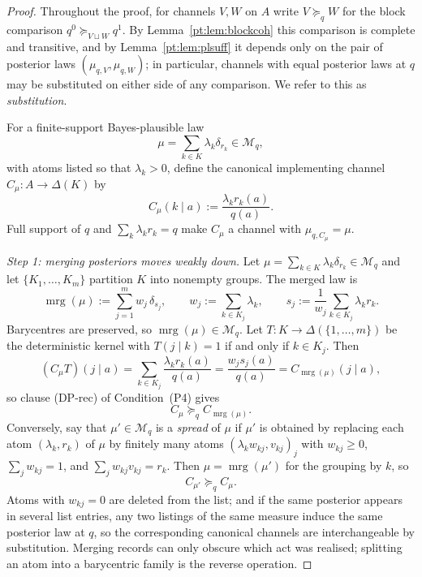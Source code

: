 \documentclass[11pt,a4paper]{article}
\theoremstyle{definition}
\newcommand{\1}{\mathbf 1}
\begin{document}
\begin{proof}
Throughout the proof, for channels $V,W$ on $A$ write $V\succeq_q W$ for the block comparison
$q^0\succeq_{V\sqcup W}q^1$.  By Lemma~\ref{pt:lem:blockcoh} this comparison is complete and transitive, and by
Lemma~\ref{pt:lem:plsuff} it depends only on the pair of posterior laws $(\mu_{q,V},\mu_{q,W})$; in particular, channels
with equal posterior laws at $q$ may be substituted on either side of any comparison.  We refer to this as
\emph{substitution}.

For a finite-support Bayes-plausible law
\[
\mu=\sum_{k\in K}\lambda_k\delta_{r_k}\in\mathcal M_q,
\]
with atoms listed so that $\lambda_k>0$, define the canonical implementing channel
$C_\mu:A\to\Delta(K)$ by
\[
C_\mu(k\mid a):=\frac{\lambda_k r_k(a)}{q(a)}.
\]
Full support of $q$ and $\sum_k\lambda_k r_k=q$ make $C_\mu$ a channel with $\mu_{q,C_\mu}=\mu$.

\emph{Step 1: merging posteriors moves weakly down.}
Let $\mu=\sum_{k\in K}\lambda_k\delta_{r_k}\in\mathcal M_q$ and let $\{K_1,\dots,K_m\}$ partition $K$ into nonempty
groups.  The merged law is
\[
\operatorname{mrg}(\mu):=\sum_{j=1}^m w_j\,\delta_{s_j},
\qquad
w_j:=\sum_{k\in K_j}\lambda_k,
\qquad
s_j:=\frac{1}{w_j}\sum_{k\in K_j}\lambda_k r_k.
\]
Barycentres are preserved, so $\operatorname{mrg}(\mu)\in\mathcal M_q$.  Let $T:K\to\Delta(\{1,\dots,m\})$ be the
deterministic kernel with $T(j\mid k)=1$ if and only if $k\in K_j$.  Then
\[
(C_\mu T)(j\mid a)
=
\sum_{k\in K_j}\frac{\lambda_k r_k(a)}{q(a)}
=
\frac{w_j s_j(a)}{q(a)}
=
C_{\operatorname{mrg}(\mu)}(j\mid a),
\]
so clause \textup{(DP-rec)} of Condition~\textup{(P4)} gives
\[
C_\mu\succeq_q C_{\operatorname{mrg}(\mu)}.
\]
Conversely, say that $\mu'\in\mathcal M_q$ is a \emph{spread} of $\mu$ if $\mu'$ is obtained by replacing each atom
$(\lambda_k,r_k)$ of $\mu$ by finitely many atoms $(\lambda_k w_{kj},v_{kj})_j$ with $w_{kj}\ge0$,
$\sum_j w_{kj}=1$, and $\sum_j w_{kj}v_{kj}=r_k$.  Then $\mu=\operatorname{mrg}(\mu')$ for the grouping by $k$, so
\[
C_{\mu'}\succeq_q C_\mu.
\]
Atoms with $w_{kj}=0$ are deleted from the list; and if the same posterior appears in several list entries, any two
listings of the same measure induce the same posterior law at $q$, so the corresponding canonical channels are
interchangeable by substitution.
Merging records can only obscure which act was realised; splitting an atom into a barycentric family is the reverse
operation.


\end{proof}
\end{document}
